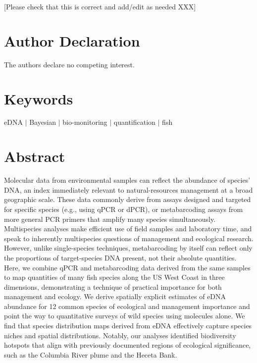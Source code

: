 \documentclass{article}
\begin{document}
[Please check that this is correct and add/edit as needed XXX]

\section*{Author Declaration}
The authors declare no competing interest.

\section*{Keywords}
eDNA $|$ Bayesian $|$ bio-monitoring $|$ quantification $|$ fish

\section*{Abstract}
Molecular data from environmental samples can reflect the abundance of species’ DNA, an index immediately relevant to natural-resources management at a broad geographic scale. These data commonly derive from assays designed and targeted for specific species (e.g., using qPCR or dPCR), or metabarcoding assays from more general PCR primers that amplify many species simultaneously. Multispecies analyses make efficient use of field samples and laboratory time, and speak to inherently multispecies questions of management and ecological research. However, unlike single-species techniques, metabarcoding by itself can reflect only the proportions of target-species DNA present, not their absolute quantities. Here, we combine qPCR and metabarcoding data derived from the same samples to map quantities of many fish species along the US West Coast in three dimensions, demonstrating a technique of practical importance for both management and ecology. We derive spatially explicit estimates of eDNA abundance for 12 common species of ecological and management importance and point the way to quantitative surveys of wild species using molecules alone. We find that species distribution maps derived from eDNA effectively capture species niches and spatial distributions. Notably, our analyses identified biodiversity hotspots that align with previously documented regions of ecological significance, such as the Columbia River plume and the Heceta Bank.
\end{document}
